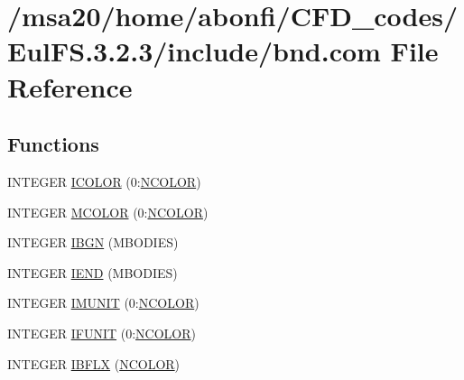 \hypertarget{msa20_2home_2abonfi_2_c_f_d__codes_2_eul_f_s_83_82_83_2include_2bnd_8com}{\section{/msa20/home/abonfi/\-C\-F\-D\-\_\-codes/\-Eul\-F\-S.3.2.3/include/bnd.com File Reference}
\label{msa20_2home_2abonfi_2_c_f_d__codes_2_eul_f_s_83_82_83_2include_2bnd_8com}
}
\subsection*{Functions}
\begin{DoxyCompactItemize}
\item 
I\-N\-T\-E\-G\-E\-R \hyperlink{msa20_2home_2abonfi_2_c_f_d__codes_2_eul_f_s_83_82_83_2include_2bnd_8com_a8750537f807f6d3cfd7aac01128e269e}{I\-C\-O\-L\-O\-R} (0\-:\hyperlink{msa20_2home_2abonfi_2_c_f_d__codes_2_eul_f_s_83_82_83_2include_2bnd_8h_a9fc66e47390039de9cc3084bf6825fe1}{N\-C\-O\-L\-O\-R})
\item 
I\-N\-T\-E\-G\-E\-R \hyperlink{msa20_2home_2abonfi_2_c_f_d__codes_2_eul_f_s_83_82_83_2include_2bnd_8com_a08b7d66e5deecd1c9a09cc14d9d107a8}{M\-C\-O\-L\-O\-R} (0\-:\hyperlink{msa20_2home_2abonfi_2_c_f_d__codes_2_eul_f_s_83_82_83_2include_2bnd_8h_a9fc66e47390039de9cc3084bf6825fe1}{N\-C\-O\-L\-O\-R})
\item 
I\-N\-T\-E\-G\-E\-R \hyperlink{msa20_2home_2abonfi_2_c_f_d__codes_2_eul_f_s_83_82_83_2include_2bnd_8com_a4842eb20d87380d011dd06416621e6aa}{I\-B\-G\-N} (M\-B\-O\-D\-I\-E\-S)
\item 
I\-N\-T\-E\-G\-E\-R \hyperlink{msa20_2home_2abonfi_2_c_f_d__codes_2_eul_f_s_83_82_83_2include_2bnd_8com_a1576f9b4b3ad9dc05bb01f76c628df7d}{I\-E\-N\-D} (M\-B\-O\-D\-I\-E\-S)
\item 
I\-N\-T\-E\-G\-E\-R \hyperlink{msa20_2home_2abonfi_2_c_f_d__codes_2_eul_f_s_83_82_83_2include_2bnd_8com_a2057fcc57502be0c35ec28e1e55dd60d}{I\-M\-U\-N\-I\-T} (0\-:\hyperlink{msa20_2home_2abonfi_2_c_f_d__codes_2_eul_f_s_83_82_83_2include_2bnd_8h_a9fc66e47390039de9cc3084bf6825fe1}{N\-C\-O\-L\-O\-R})
\item 
I\-N\-T\-E\-G\-E\-R \hyperlink{msa20_2home_2abonfi_2_c_f_d__codes_2_eul_f_s_83_82_83_2include_2bnd_8com_a39e875fb16285a881e304a8e836d5bf8}{I\-F\-U\-N\-I\-T} (0\-:\hyperlink{msa20_2home_2abonfi_2_c_f_d__codes_2_eul_f_s_83_82_83_2include_2bnd_8h_a9fc66e47390039de9cc3084bf6825fe1}{N\-C\-O\-L\-O\-R})
\item 
I\-N\-T\-E\-G\-E\-R \hyperlink{msa20_2home_2abonfi_2_c_f_d__codes_2_eul_f_s_83_82_83_2include_2bnd_8com_addddb18e9abe37720d5601329ff81f6a}{I\-B\-F\-L\-X} (\hyperlink{msa20_2home_2abonfi_2_c_f_d__codes_2_eul_f_s_83_82_83_2include_2bnd_8h_a9fc66e47390039de9cc3084bf6825fe1}{N\-C\-O\-L\-O\-R})
\end{DoxyCompactItemize}


